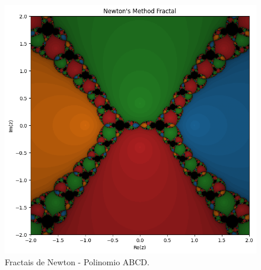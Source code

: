 \begin{figure}[H]
    \centering
    \includegraphics[width=1\textwidth]{Imagens/nr2d_fractals/polinomials/nrfractal_polinomio4.png}
    \caption{Fractais de Newton - Polinomio ABCD.}
    \label{fig:fractaisnr_polinomials1}
\end{figure}
